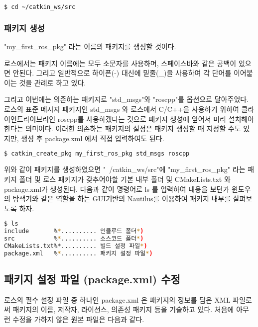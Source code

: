 \begin{lstlisting}[language=bash]
$ cd ~/catkin_ws/src
\end{lstlisting}

\subsubsection{패키지 생성}

"my\_first\_ros\_pkg" 라는 이름의 패키지를 생성할 것이다. 

로스에서는 패키지 이름에는 모두 소문자를 사용하며, 스페이스바와 같은 공백이 있으면 안된다. 그리고 일반적으로 하이픈(-) 대신에 밑줄(\_)을 사용하여 각 단어를 이어붙이는 것을 관례로 하고 있다. 

그리고 이번에는 의존하는 패키지로 "std\_msgs"와 "roscpp"를 옵션으로 달아주었다. 로스의 표준 메시지 패키지인 std\_msgs 와 로스에서 C/C++을 사용하기 위하여 클라이언트라이브러인 roscpp를 사용하겠다는 것으로 패키지 생성에 앞어서 미리 설치해야한다는 의미이다. 이러한 의존하는 패키지의 설정은 패키지 생성할 때 지정할 수도 있지만, 생성 후 package.xml 에서 직접 입력하여도 된다.

\begin{lstlisting}[language=bash]
$ catkin_create_pkg my_first_ros_pkg std_msgs roscpp
\end{lstlisting}

위와 같이 패키지를 생성하였으면 "~/catkin\_ws/src"에 "my\_first\_ros\_pkg" 라는 패키지 폴더 및 로스 패키지가 갖추어야할 기본 내부 폴더 및 CMakeLists.txt 와 package.xml가 생성된다. 다음과 같이 명령어로 ls 를 입력하여 내용을 보던가 윈도우의 탐색기와 같은 역할을 하는 GUI기반의 Nautilus를 이용하여 패키지 내부를 살펴보도록 하자.

\begin{lstlisting}[language=bash]
$ ls
include       %*.......... 인클루드 폴더*)
src           %*.......... 소스코드 폴더*)
CMakeLists.txt%*.......... 빌드 설정 파일*)
package.xml   %*.......... 패키지 설정 파일*)
\end{lstlisting}

\subsection{패키지 설정 파일 (package.xml) 수정}

로스의 필수 설정 파일 중 하나인 package.xml 은 패키지의 정보를 담은 XML 파일로써 패키지의 이름, 저작자, 라이선스, 의존성 패키지 등을 기술하고 있다. 처음에 아무런 수정을 가하지 않은 원본 파일은 다음과 같다.

